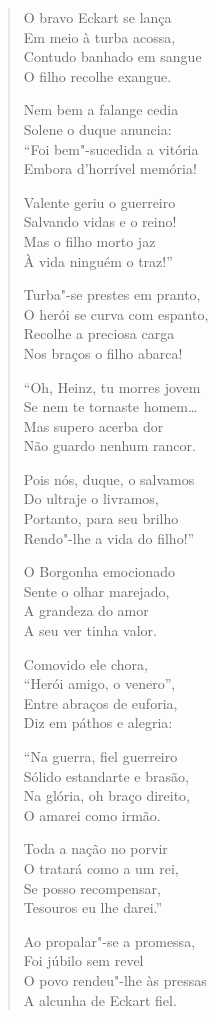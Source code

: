\begin{verse}
O bravo Eckart se lança\\
Em meio à turba acossa,\\
Contudo banhado em sangue\\
O filho recolhe exangue.

Nem bem a falange cedia\\
Solene o duque anuncia:\\
``Foi bem"-sucedida a vitória\\
Embora d'horrível memória!

Valente geriu o guerreiro\\
Salvando vidas e o reino!\\
Mas o filho morto jaz\\
À vida ninguém o traz!''

Turba"-se prestes em pranto,\\
O herói se curva com espanto,\\
Recolhe a preciosa carga\\
Nos braços o filho abarca!
 
``Oh, Heinz, tu morres jovem\\
Se nem te tornaste homem\ldots{}\\
Mas supero acerba dor\\
Não guardo nenhum rancor. 

Pois nós, duque, o salvamos\\
Do ultraje o livramos,\\
Portanto, para seu brilho\\
Rendo"-lhe a vida do filho!''

O Borgonha emocionado\\
Sente o olhar marejado,\\
A grandeza do amor\\
A seu ver tinha valor.

Comovido ele chora,\\
``Herói amigo, o venero'',\\
Entre abraços de euforia,\\
Diz em páthos e alegria:

``Na guerra, fiel guerreiro\\
Sólido estandarte e brasão,\\
Na glória, oh braço direito,\\
O amarei como irmão.

Toda a nação no porvir\\
O tratará como a um rei,\\
Se posso recompensar,\\
Tesouros eu lhe darei.''

Ao propalar"-se a promessa,\\
Foi júbilo sem revel\\
O povo rendeu"-lhe às pressas\\
A alcunha de Eckart fiel. 
\end{verse}


